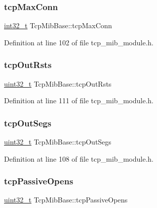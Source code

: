 \subsubsection{\texorpdfstring{tcp\+Max\+Conn}{tcpMaxConn}}
{\footnotesize\ttfamily \hyperlink{stdint_8h_ab1967d8591af1a4e48c37fd2b0f184d0}{int32\+\_\+t} Tcp\+Mib\+Base\+::tcp\+Max\+Conn}



Definition at line 102 of file tcp\+\_\+mib\+\_\+module.\+h.

\mbox{\label{structTcpMibBase_a60c89da35e9b3927b1ae110af0e2a430}} 
\subsubsection{\texorpdfstring{tcp\+Out\+Rsts}{tcpOutRsts}}
{\footnotesize\ttfamily \hyperlink{stdint_8h_a435d1572bf3f880d55459d9805097f62}{uint32\+\_\+t} Tcp\+Mib\+Base\+::tcp\+Out\+Rsts}



Definition at line 111 of file tcp\+\_\+mib\+\_\+module.\+h.

\mbox{\label{structTcpMibBase_a2255475e50c86d6f18a0b1a37bd7b42b}} 
\subsubsection{\texorpdfstring{tcp\+Out\+Segs}{tcpOutSegs}}
{\footnotesize\ttfamily \hyperlink{stdint_8h_a435d1572bf3f880d55459d9805097f62}{uint32\+\_\+t} Tcp\+Mib\+Base\+::tcp\+Out\+Segs}



Definition at line 108 of file tcp\+\_\+mib\+\_\+module.\+h.

\mbox{\label{structTcpMibBase_a911158b84c07b2df6dea98ca3dd67310}} 
\subsubsection{\texorpdfstring{tcp\+Passive\+Opens}{tcpPassiveOpens}}
{\footnotesize\ttfamily \hyperlink{stdint_8h_a435d1572bf3f880d55459d9805097f62}{uint32\+\_\+t} Tcp\+Mib\+Base\+::tcp\+Passive\+Opens}



